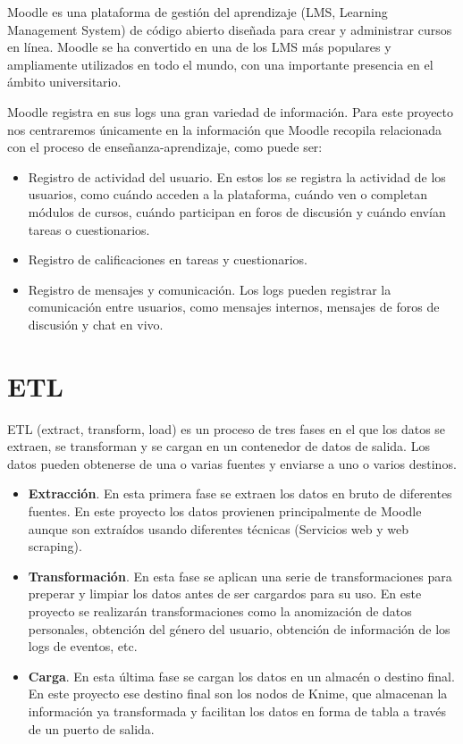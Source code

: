 Moodle es una plataforma de gestión del aprendizaje (LMS, Learning Management System) de código abierto diseñada
 para crear y administrar cursos en línea. Moodle se ha convertido en una de los LMS más populares y ampliamente 
 utilizados en todo el mundo, con una importante presencia en el ámbito universitario.
\

Moodle registra en sus logs una gran variedad de información. Para este proyecto nos centraremos únicamente en 
la información que Moodle recopila relacionada con el proceso de enseñanza-aprendizaje, como puede ser: 

\begin{itemize}
  \item Registro de actividad del usuario. En estos los se registra la actividad de los usuarios, como cuándo 
  acceden a la plataforma, cuándo ven o completan módulos de cursos, cuándo participan en foros de discusión y
   cuándo envían tareas o cuestionarios. 
  \item Registro de calificaciones en tareas y cuestionarios.
  \item Registro de mensajes y comunicación. Los logs pueden registrar la comunicación entre usuarios, 
  como mensajes internos, mensajes de foros de discusión y chat en vivo.
\end{itemize}



\section{ETL}

ETL (extract, transform, load) es un proceso de tres fases en el que los datos se extraen, se transforman y se cargan en un 
contenedor de datos de salida. Los datos pueden obtenerse de una o varias fuentes y enviarse a uno o varios destinos.

\begin{itemize}
	\item \textbf{Extracción}. En esta primera fase se extraen los datos en bruto de diferentes fuentes. En este proyecto los datos 
    provienen principalmente de Moodle aunque son extraídos usando diferentes técnicas (Servicios web y web scraping). 
	\item \textbf{Transformación}. En esta fase se aplican una serie de transformaciones para preperar y limpiar los datos antes de 
	ser cargardos para su uso. En este proyecto se realizarán transformaciones como la anomización de datos personales, 
    obtención del género del usuario, obtención de información de los logs de eventos, etc.     
	\item \textbf{Carga}. En esta última fase se cargan los datos en un almacén o destino final. En este proyecto ese destino final son 
	los nodos de Knime, que almacenan la información ya transformada y facilitan los datos en forma de tabla a través de un puerto de salida. 
\end{itemize}



